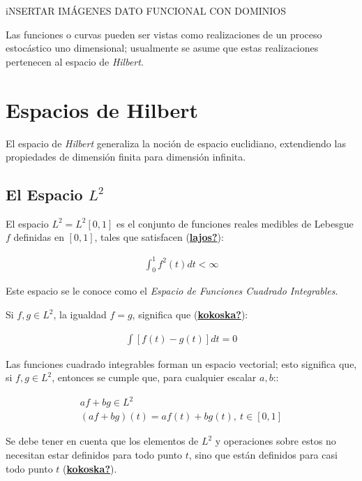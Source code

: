\documentclass[
]{book}
\begin{document}
{iNSERTAR IMÁGENES DATO FUNCIONAL CON DOMINIOS}

Las funciones o curvas pueden ser vistas como realizaciones de un proceso estocástico uno dimensional; usualmente se asume que estas realizaciones pertenecen al espacio de \emph{Hilbert}.\\

\hypertarget{espacios-de-hilbert}{%
\section{Espacios de Hilbert}\label{espacios-de-hilbert}}

El espacio de \emph{Hilbert} generaliza la noción de espacio euclidiano, extendiendo las propiedades de dimensión finita para dimensión infinita.

\hypertarget{el-espacio-l2}{%
\subsection{\texorpdfstring{\textbf{El Espacio} \(L^2\)}{El Espacio L\^{}2}}\label{el-espacio-l2}}

El espacio \(L^2=L^2[0,1]\) es el conjunto de funciones reales medibles de Lebesgue \(f\) definidas en \([0,1]\), tales que satisfacen (\protect\hyperlink{ref-lajos}{\textbf{lajos?}}):

\begin{align}
    \int_0^1 f^2(t)dt<\infty
\end{align}

Este espacio se le conoce como el \emph{Espacio de Funciones Cuadrado Integrables}.

Si \(f,g \in L^2\), la igualdad \(f=g\), significa que (\protect\hyperlink{ref-kokoska}{\textbf{kokoska?}}):

\begin{align}
    \int[f(t)-g(t)]dt=0
\end{align}

Las funciones cuadrado integrables forman un espacio vectorial; esto significa que, si \(f,g\in L^2\), entonces se cumple que, para cualquier escalar \(a,b\)::

\begin{align}
        af+bg\in L^2\hspace{2cm}\\
         (af+bg)(t)=af(t)+bg(t),\ t \in [0,1]
  \end{align}

Se debe tener en cuenta que los elementos de \(L^2\) y operaciones sobre estos no necesitan estar definidos para todo punto \(t\), sino que están definidos para casi todo punto \(t\) (\protect\hyperlink{ref-kokoska}{\textbf{kokoska?}}).
\end{document}
